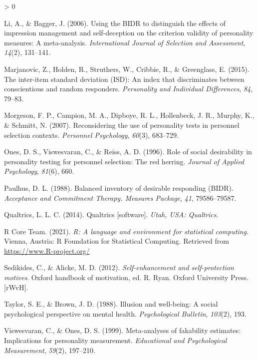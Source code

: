 \documentclass[
  english,
  ,jou]{apa6}
\newlength{\cslhangindent}
\newenvironment{CSLReferences}[2] %
 {%
  \setlength{\parindent}{0pt}
  \ifodd #1 \everypar{\setlength{\hangindent}{\cslhangindent}}\ignorespaces\fi
  \ifnum #2 > 0
  \setlength{\parskip}{#2\baselineskip}
  \fi
 }%
 {}
\begin{document}
\begin{CSLReferences}{1}{0}
\leavevmode\hypertarget{ref-li_using_2006}{}%
Li, A., \& Bagger, J. (2006). Using the {BIDR} to distinguish the effects of impression management and self-deception on the criterion validity of personality measures: A meta-analysis. \emph{International Journal of Selection and Assessment}, \emph{14}(2), 131--141.

\leavevmode\hypertarget{ref-marjanovic_inter-item_2015}{}%
Marjanovic, Z., Holden, R., Struthers, W., Cribbie, R., \& Greenglass, E. (2015). The inter-item standard deviation ({ISD}): An index that discriminates between conscientious and random responders. \emph{Personality and Individual Differences}, \emph{84}, 79--83.

\leavevmode\hypertarget{ref-morgeson_reconsidering_2007}{}%
Morgeson, F. P., Campion, M. A., Dipboye, R. L., Hollenbeck, J. R., Murphy, K., \& Schmitt, N. (2007). Reconsidering the use of personality tests in personnel selection contexts. \emph{Personnel Psychology}, \emph{60}(3), 683--729.

\leavevmode\hypertarget{ref-ones_role_1996}{}%
Ones, D. S., Viswesvaran, C., \& Reiss, A. D. (1996). Role of social desirability in personality testing for personnel selection: The red herring. \emph{Journal of Applied Psychology}, \emph{81}(6), 660.

\leavevmode\hypertarget{ref-paulhus_balanced_1988}{}%
Paulhus, D. L. (1988). Balanced inventory of desirable responding ({BIDR}). \emph{Acceptance and Commitment Therapy. Measures Package}, \emph{41}, 79586--79587.

\leavevmode\hypertarget{ref-qualtrics_qualtrics_2014}{}%
Qualtrics, L. L. C. (2014). Qualtrics {[}software{]}. \emph{Utah, {USA}: Qualtrics}.

\leavevmode\hypertarget{ref-R-base}{}%
R Core Team. (2021). \emph{R: A language and environment for statistical computing}. Vienna, Austria: R Foundation for Statistical Computing. Retrieved from \url{https://www.R-project.org/}

\leavevmode\hypertarget{ref-sedikides_self-enhancement_2012}{}%
Sedikides, C., \& Alicke, M. D. (2012). \emph{Self-enhancement and self-protection motives}. Oxford handbook of motivation, ed. R. Ryan. Oxford University Press.{[}{rWvH}{]}.

\leavevmode\hypertarget{ref-taylor_illusion_1988}{}%
Taylor, S. E., \& Brown, J. D. (1988). Illusion and well-being: A social psychological perspective on mental health. \emph{Psychological Bulletin}, \emph{103}(2), 193.

\leavevmode\hypertarget{ref-viswesvaran_meta-analyses_1999}{}%
Viswesvaran, C., \& Ones, D. S. (1999). Meta-analyses of fakability estimates: Implications for personality measurement. \emph{Educational and Psychological Measurement}, \emph{59}(2), 197--210.


\end{CSLReferences}
\end{document}
